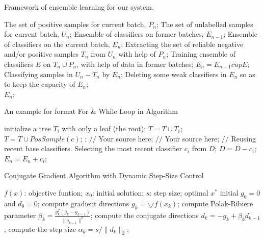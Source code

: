 \begin{algorithm}[htb]
  \caption{ Framework of ensemble learning for our system.}
  \label{alg:Framwork}
  \begin{algorithmic}[1]
    \Require
      The set of positive samples for current batch, $P_n$;
      The set of unlabelled samples for current batch, $U_n$;
      Ensemble of classifiers on former batches, $E_{n-1}$;
    \Ensure
      Ensemble of classifiers on the current batch, $E_n$;
    \State Extracting the set of reliable negative and/or positive samples $T_n$ from $U_n$ with help of $P_n$;
    \label{code:fram:extract}
    \State Training ensemble of classifiers $E$ on $T_n \cup P_n$, with help of data in former batches;
    \label{code:fram:trainbase}
    \State $E_n=E_{n-1}cup E$;
    \label{code:fram:add}
    \State Classifying samples in $U_n-T_n$ by $E_n$;
    \label{code:fram:classify}
    \State Deleting some weak classifiers in $E_n$ so as to keep the capacity of $E_n$;
    \label{code:fram:select} \\
    \Return $E_n$;
  \end{algorithmic}
\end{algorithm}

\begin{algorithm}[h]
  \caption{An example for format For \& While Loop in Algorithm}
  \begin{algorithmic}[1]
      \State initialize a tree $T_{i}$ with only a leaf (the root);
      \State $T=T\cup T_{i};$
    \EndFor
      \label{code:TrainBase:getc}
      \State $T=T\cup PosSample(c)$;
      \label{code:TrainBase:pos}
    \EndFor;
      \State $//$ Your source here;
    \EndFor
      \State $//$ Your source here;
    \EndFor
    \State $//$ Reusing recent base classifiers.
    \label{code:recentStart}
      \State Selecting the most recent classifier $c_i$ from $D$;
      \State $D=D-c_i$;
      \State $E_n=E_n+c_i$;
    \EndWhile
    \label{code:recentEnd}
  \end{algorithmic}
\end{algorithm}

\begin{algorithm}[h]
  \caption{Conjugate Gradient Algorithm with Dynamic Step-Size Control}
  \label{alg::conjugateGradient}
  \begin{algorithmic}[1]
    \Require
      $f(x)$: objective funtion;
      $x_0$: initial solution;
      $s$: step size;
    \Ensure
      optimal $x^{*}$
    \State initial $g_0=0$ and $d_0=0$;
    \Repeat
      \State compute gradient directions $g_k=\bigtriangledown f(x_k)$;
      \State compute Polak-Ribiere parameter $\beta_k=\frac{g_k^{T}(g_k-g_{k-1})}{\parallel g_{k-1} \parallel^{2}}$;
      \State compute the conjugate directions $d_k=-g_k+\beta_k d_{k-1}$;
      \State compute the step size $\alpha_k=s/\parallel d_k \parallel_{2}$;
  \end{algorithmic}
\end{algorithm}